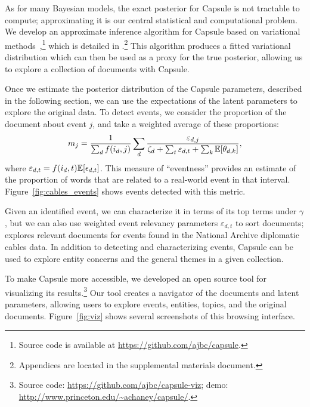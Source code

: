 As for many Bayesian models, the exact posterior for Capsule is not tractable to compute; approximating it is our central statistical and computational problem.  We develop an approximate inference algorithm for Capsule based on variational methods~\cite{Jordan:1999},\footnote{Source code is available at \url{https://github.com/ajbc/capsule}.} which is detailed in .\footnote{Appendices are located in the supplemental materials document.} This algorithm produces a fitted variational distribution which can then be used as a proxy for the true posterior, allowing us to explore a collection of documents with Capsule.


Once we estimate the posterior distribution of the Capsule parameters, described in the following section, we can use the expectations of the latent parameters to explore the original data.  To detect events, we consider the proportion of the document about event $j$, and take a weighted average of these proportions:
\begin{equation*}
m_j = \frac{1}{\sum_{d} f(i_d, j)} \sum_{d}\frac{\varepsilon_{d,j}}{\zeta_d + \sum_{t} \varepsilon_{d,t} + \sum_{k} \mathbb{E}[\theta_{d,k}] },
\label{eq:eventness}
\end{equation*}
where $\varepsilon_{d,t} = f(i_d, t) \mathbb{E}[\epsilon_{d,t}]$.
This measure of ``eventness'' provides an estimate of the proportion of words that are related to a real-world event in that interval.  Figure~\ref{fig:cables_events} shows events detected with this metric.

Given an identified event, we can characterize it in terms of its top terms under $\gamma$, but we can also use weighted event relevancy parameters $\varepsilon_{d,t}$ to sort documents;  explores relevant documents for events found in the National Archive diplomatic cables data.
In addition to detecting and characterizing events, Capsule can be used to explore entity concerns and the general themes in a given collection.

To make Capsule more accessible, we developed an open source tool for visualizing its results.\footnote{Source code: \url{https://github.com/ajbc/capsule-viz}; demo: \url{http://www.princeton.edu/~achaney/capsule/}.}  Our tool creates a navigator of the documents and latent parameters, allowing users to explore events, entities, topics, and the original documents.  Figure~\ref{fig:viz} shows several screenshots of this browsing interface.

